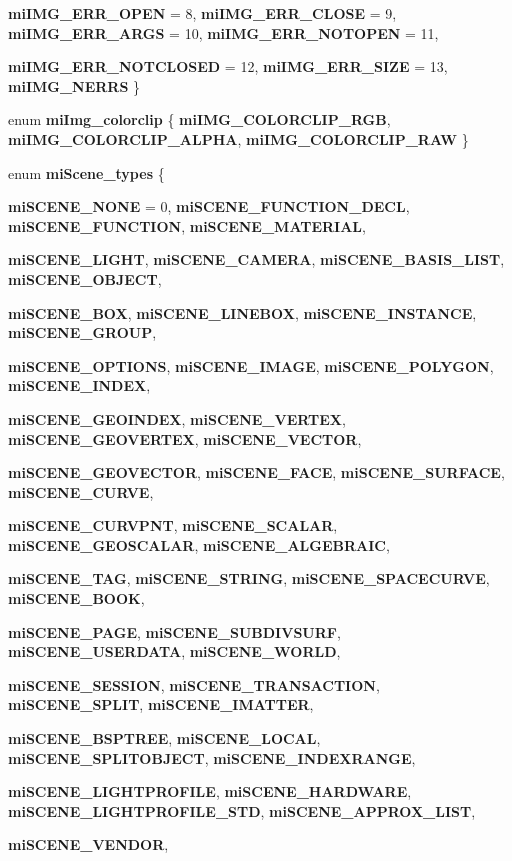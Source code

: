\begin{CompactItemize}
{\bf mi\-IMG\_\-ERR\_\-OPEN} =  8, 
{\bf mi\-IMG\_\-ERR\_\-CLOSE} =  9, 
{\bf mi\-IMG\_\-ERR\_\-ARGS} =  10, 
{\bf mi\-IMG\_\-ERR\_\-NOTOPEN} =  11, 
\par
{\bf mi\-IMG\_\-ERR\_\-NOTCLOSED} =  12, 
{\bf mi\-IMG\_\-ERR\_\-SIZE} =  13, 
{\bf mi\-IMG\_\-NERRS}
 \}
\item 
enum {\bf mi\-Img\_\-colorclip} \{ {\bf mi\-IMG\_\-COLORCLIP\_\-RGB}, 
{\bf mi\-IMG\_\-COLORCLIP\_\-ALPHA}, 
{\bf mi\-IMG\_\-COLORCLIP\_\-RAW}
 \}
\item 
enum {\bf mi\-Scene\_\-types} \{ \par
{\bf mi\-SCENE\_\-NONE} =  0, 
{\bf mi\-SCENE\_\-FUNCTION\_\-DECL}, 
{\bf mi\-SCENE\_\-FUNCTION}, 
{\bf mi\-SCENE\_\-MATERIAL}, 
\par
{\bf mi\-SCENE\_\-LIGHT}, 
{\bf mi\-SCENE\_\-CAMERA}, 
{\bf mi\-SCENE\_\-BASIS\_\-LIST}, 
{\bf mi\-SCENE\_\-OBJECT}, 
\par
{\bf mi\-SCENE\_\-BOX}, 
{\bf mi\-SCENE\_\-LINEBOX}, 
{\bf mi\-SCENE\_\-INSTANCE}, 
{\bf mi\-SCENE\_\-GROUP}, 
\par
{\bf mi\-SCENE\_\-OPTIONS}, 
{\bf mi\-SCENE\_\-IMAGE}, 
{\bf mi\-SCENE\_\-POLYGON}, 
{\bf mi\-SCENE\_\-INDEX}, 
\par
{\bf mi\-SCENE\_\-GEOINDEX}, 
{\bf mi\-SCENE\_\-VERTEX}, 
{\bf mi\-SCENE\_\-GEOVERTEX}, 
{\bf mi\-SCENE\_\-VECTOR}, 
\par
{\bf mi\-SCENE\_\-GEOVECTOR}, 
{\bf mi\-SCENE\_\-FACE}, 
{\bf mi\-SCENE\_\-SURFACE}, 
{\bf mi\-SCENE\_\-CURVE}, 
\par
{\bf mi\-SCENE\_\-CURVPNT}, 
{\bf mi\-SCENE\_\-SCALAR}, 
{\bf mi\-SCENE\_\-GEOSCALAR}, 
{\bf mi\-SCENE\_\-ALGEBRAIC}, 
\par
{\bf mi\-SCENE\_\-TAG}, 
{\bf mi\-SCENE\_\-STRING}, 
{\bf mi\-SCENE\_\-SPACECURVE}, 
{\bf mi\-SCENE\_\-BOOK}, 
\par
{\bf mi\-SCENE\_\-PAGE}, 
{\bf mi\-SCENE\_\-SUBDIVSURF}, 
{\bf mi\-SCENE\_\-USERDATA}, 
{\bf mi\-SCENE\_\-WORLD}, 
\par
{\bf mi\-SCENE\_\-SESSION}, 
{\bf mi\-SCENE\_\-TRANSACTION}, 
{\bf mi\-SCENE\_\-SPLIT}, 
{\bf mi\-SCENE\_\-IMATTER}, 
\par
{\bf mi\-SCENE\_\-BSPTREE}, 
{\bf mi\-SCENE\_\-LOCAL}, 
{\bf mi\-SCENE\_\-SPLITOBJECT}, 
{\bf mi\-SCENE\_\-INDEXRANGE}, 
\par
{\bf mi\-SCENE\_\-LIGHTPROFILE}, 
{\bf mi\-SCENE\_\-HARDWARE}, 
{\bf mi\-SCENE\_\-LIGHTPROFILE\_\-STD}, 
{\bf mi\-SCENE\_\-APPROX\_\-LIST}, 
\par
{\bf mi\-SCENE\_\-VENDOR}, 

\end{CompactItemize}
